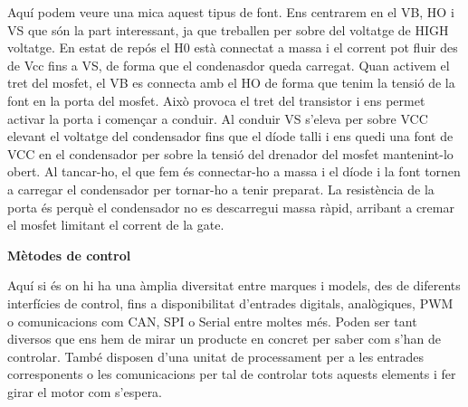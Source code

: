 Aquí podem veure una mica aquest tipus de font. Ens centrarem en el VB, HO i VS que són la part interessant, ja que treballen per sobre del voltatge de HIGH voltatge. En estat de repós el H0 està connectat a massa i el corrent pot fluir des de Vcc fins a VS, de forma que el condenasdor queda carregat. Quan activem el tret del mosfet, el VB es connecta amb el HO de forma que tenim la tensió de la font en la porta del mosfet. Això provoca el tret del transistor i ens permet activar la porta i començar a conduir. Al conduir VS s'eleva per sobre VCC elevant el voltatge del condensador fins que el díode talli i ens quedi una font de VCC en el condensador per sobre la tensió del drenador del mosfet mantenint-lo obert. Al tancar-ho, el que fem és connectar-ho a massa i el díode i la font tornen a carregar el condensador per tornar-ho a tenir preparat. La resistència de la porta és perquè el condensador no es descarregui massa ràpid, arribant a cremar el mosfet limitant el corrent de la gate.
 
 \textbf{Mètodes de control}\newline \smallskip
 
 Aquí si és on hi ha una àmplia diversitat entre marques i models, des de diferents interfícies de control, fins a disponibilitat d'entrades digitals, analògiques, PWM o comunicacions com CAN, SPI o Serial entre moltes més. Poden ser tant diversos que ens hem de mirar un producte en concret per saber com s'han de controlar. També disposen d'una unitat de processament per a les entrades corresponents o les comunicacions per tal de controlar tots aquests elements i  fer girar el motor com s'espera. 
 
